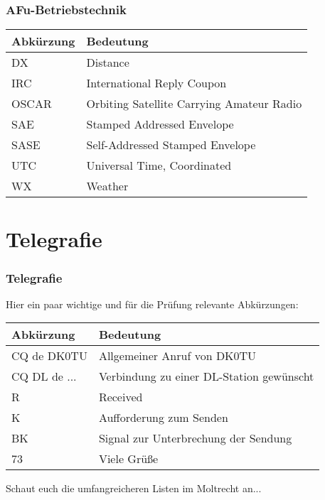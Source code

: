\begin{frame}
    \frametitle{AFu-Betriebstechnik}

    \begin{center}
    \footnotesize
    \begin{tabular}{|l|l|}\hline
        \textbf{Abkürzung} & \textbf{Bedeutung}                         \\ \hline \hline
        DX    & Distance                                                \\ \hline
        IRC   & International Reply Coupon                              \\ \hline
        OSCAR & Orbiting Satellite Carrying Amateur Radio               \\ \hline
        SAE   & Stamped Addressed Envelope                              \\ \hline
        SASE  & Self-Addressed Stamped Envelope                         \\ \hline
        UTC   & Universal Time, Coordinated                             \\ \hline
        WX    & Weather                                                 \\ \hline
    \end{tabular}
    \end{center}

\end{frame}

\section*{Telegrafie}

\begin{frame}
    \frametitle{Telegrafie}

    Hier ein paar wichtige und für die Prüfung relevante Abkürzungen:

    \begin{center}
    \footnotesize
    \begin{tabular}{|l|l|}\hline
        \textbf{Abkürzung} & \textbf{Bedeutung}                         \\ \hline \hline
        CQ de DK0TU & Allgemeiner Anruf von DK0TU                       \\ \hline
        CQ DL de ...& Verbindung zu einer DL-Station gewünscht          \\ \hline
        R           & Received                                          \\ \hline
        K           & Aufforderung zum Senden                           \\ \hline
        BK          & Signal zur Unterbrechung der Sendung              \\ \hline
        73          & Viele Grüße                                       \\ \hline
    \end{tabular}
    \end{center}
   
    Schaut euch die umfangreicheren Listen im Moltrecht an...

\end{frame}

